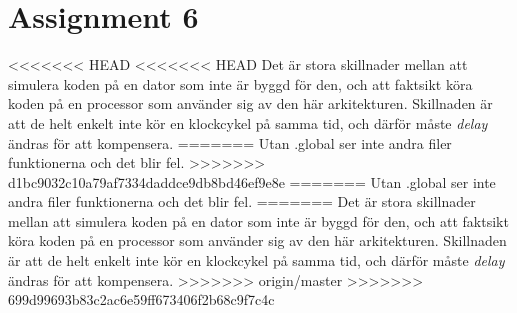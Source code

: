 \documentclass[a4paper,11p]{article}
\begin{document}
\section{Assignment 6}
<<<<<<< HEAD
<<<<<<< HEAD
Det är stora skillnader mellan att simulera koden på en dator som inte är byggd för den, och att faktsikt köra koden på en processor som använder sig av den här arkitekturen. Skillnaden är att de helt enkelt inte kör en klockcykel på samma tid, och därför måste \emph{delay} ändras för att kompensera.
=======
Utan .global ser inte andra filer funktionerna och det blir fel.
>>>>>>> d1bc9032c10a79af7334daddce9db8bd46ef9e8e
=======
Utan .global ser inte andra filer funktionerna och det blir fel.
=======
Det är stora skillnader mellan att simulera koden på en dator som inte är byggd för den, och att faktsikt köra koden på en processor som använder sig av den här arkitekturen. Skillnaden är att de helt enkelt inte kör en klockcykel på samma tid, och därför måste \emph{delay} ändras för att kompensera.
>>>>>>> origin/master
>>>>>>> 699d99693b83c2ac6e59ff673406f2b68c9f7c4c
\end{document}
